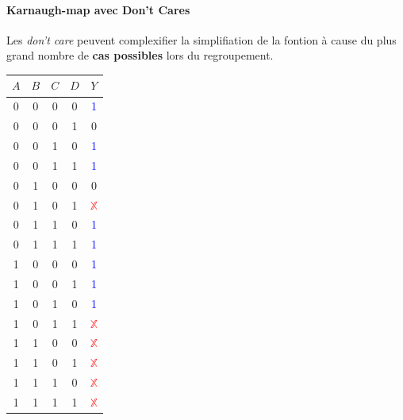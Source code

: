 \documentclass{report}
\begin{document}
\begin{multicols*}{3}
  \paragraph{Karnaugh-map avec Don't Cares}
  Les \textit{don't care} peuvent complexifier la simplifiation de la 
  fontion à cause du plus grand nombre de \textbf{cas possibles}
  lors du regroupement. 



  \begin{table}[H]
    \centering
    \renewcommand{\arraystretch}{1.5}
    \setlength{\arrayrulewidth}{0.4pt}
    \scriptsize
    \begin{tabular}{|c|c|c|c||c|}
      \hline
      \rowcolor{lightBlue}
      \textcolor{myb}{$A$} & \textcolor{myb}{$B$} & \textcolor{myb}{$C$} & \textcolor{myb}{$D$} & \textcolor{myb}{$Y$} 
      \\ \hline
      0 & 0 & 0 & 0 & \textcolor{blue}{1} \\
      \rowcolor{lightBlue}
      0 & 0 & 0 & 1 & 0 \\
      0 & 0 & 1 & 0 &  \textcolor{blue}{1}  \\
      \rowcolor{lightBlue}
      0 & 0 & 1 & 1 & \textcolor{blue}{1} \\
      0 & 1 & 0 & 0 & 0 \\
      \rowcolor{lightBlue}
      0 & 1 & 0 & 1 & \textcolor{red}{$\mathbb{X}$}    \\
      0 & 1 & 1 & 0 & \textcolor{blue}{1}  \\
      \rowcolor{lightBlue}
      0 & 1 & 1 & 1 & \textcolor{blue}{1} \\
      1 & 0 & 0 & 0 & \textcolor{blue}{1} \\
      \rowcolor{lightBlue}
      1 & 0 & 0 & 1 & \textcolor{blue}{1} \\
      1 & 0 & 1 & 0 & \textcolor{blue}{1} \\
      \rowcolor{lightBlue}
      1 & 0 & 1 & 1 & \textcolor{red}{$\mathbb{X}$} \\
      1 & 1 & 0 & 0 & \textcolor{red}{$\mathbb{X}$} \\
      \rowcolor{lightBlue}
      1 & 1 & 0 & 1 & \textcolor{red}{$\mathbb{X}$} \\
      1 & 1 & 1 & 0 & \textcolor{red}{$\mathbb{X}$} \\
      \rowcolor{lightBlue}
      1 & 1 & 1 & 1 & \textcolor{red}{$\mathbb{X}$} \\
      \hline
    \end{tabular}
  \end{table}


\end{multicols*}
\end{document}
